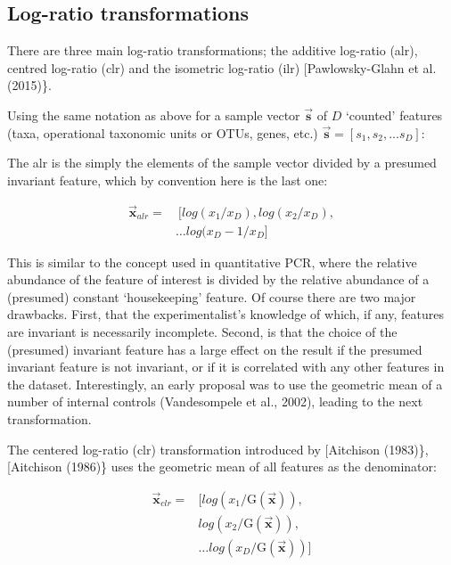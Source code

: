 \documentclass[twocolumn]{article}
\begin{document}
\subsection{Log-ratio transformations}\label{log-ratio-transformations}

There are three main log-ratio transformations; the additive log-ratio
(alr), centred log-ratio (clr) and the isometric log-ratio (ilr)
{[}Pawlowsky-Glahn et al. (2015)\}.

Using the same notation as above for a sample vector
\(\vec{\textbf{s}}\) of \(D\) `counted' features (taxa, operational
taxonomic units or OTUs, genes, etc.)
\(\vec{\textbf{s}}=[s_1, s_2, ... s_D]\):

The alr is the simply the elements of the sample vector divided by a
presumed invariant feature, which by convention here is the last one:

\begin{equation}
\begin{aligned}
 \vec{\textbf{x}}_{alr}= &\ [log(x_1/x_D), log(x_2/x_D), \\
 & \ldots log(x_D-1/x_D]
\end{aligned}
 \label{eq:alr}
\end{equation}

This is similar to the concept used in quantitative PCR, where the
relative abundance of the feature of interest is divided by the relative
abundance of a (presumed) constant `housekeeping' feature. Of course
there are two major drawbacks. First, that the experimentalist's
knowledge of which, if any, features are invariant is necessarily
incomplete. Second, is that the choice of the (presumed) invariant
feature has a large effect on the result if the presumed invariant
feature is not invariant, or if it is correlated with any other features
in the dataset. Interestingly, an early proposal was to use the
geometric mean of a number of internal controls (Vandesompele et al.,
2002), leading to the next transformation.

The centered log-ratio (clr) transformation introduced by {[}Aitchison
(1983)\},{[}Aitchison (1986)\} uses the geometric mean of all features
as the denominator:

\begin{equation}
\begin{aligned}
   \vec{\textbf{x}}_{clr} = & [log(x_1/\mathrm{G}(\vec{\textbf{x}})), \\
   & log(x_2/\mathrm{G}(\vec{\textbf{x}})), \\
   & \ldots log(x_D/\mathrm{G}(\vec{\textbf{x}}))]
\end{aligned}
\label{eq:clr}
\end{equation}
\end{document}
